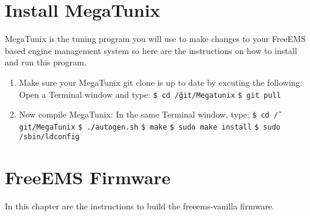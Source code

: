 \documentclass[12pt,notitlepage,onecolumn,oneside,openany]{memoir}
\begin{document}
\chapter{\textsf{Install MegaTunix}}

\textsf{MegaTunix is the tuning program you will use to make changes to your FreeEMS based engine management system so here are the instructions on how to install and run this program.} \newline

\begin{enumerate}
\item \textsf{Make sure your MegaTunix git clone is up to date by excuting the following:} \newline
      \textsf{Open a Terminal window and type:} \newline
      \texttt{\$ cd \~/git/Megatunix} \newline
      \texttt{\$ git pull}

\item \textsf{Now compile MegaTunix:} \newline
      \textsf{In the same Terminal window, type:} \newline
      \texttt{\$ cd \~/git/MegaTunix} \newline
      \texttt{\$ ./autogen.sh} \newline
      \texttt{\$ make} \newline
      \texttt{\$ sudo make install} \newline
      \texttt{\$ sudo /sbin/ldconfig} \newline
\end{enumerate}

\chapter{\textsf{FreeEMS Firmware}}

\textsf{In this chapter are the instructions to build the freeems-vanilla firmware.} \newline
\end{document}
